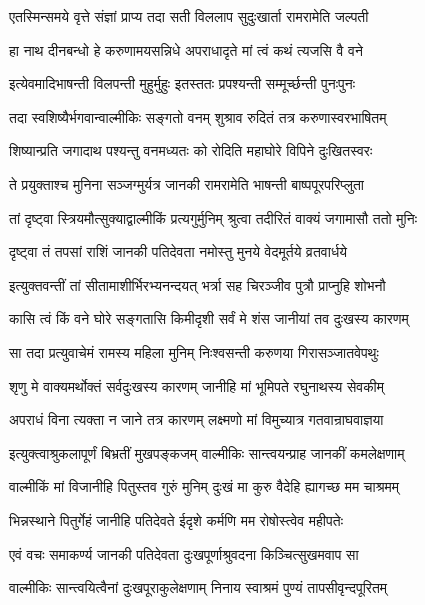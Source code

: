 \twolineshloka
{एतस्मिन्समये वृत्ते संज्ञां प्राप्य तदा सती}
{विललाप सुदुःखार्ता रामरामेति जल्पती}%

\twolineshloka
{हा नाथ दीनबन्धो हे करुणामयसन्निधे}
{अपराधादृते मां त्वं कथं त्यजसि वै वने}%

\twolineshloka
{इत्येवमादिभाषन्ती विलपन्ती मुहुर्मुहुः}
{इतस्ततः प्रपश्यन्ती सम्मूर्च्छन्ती पुनःपुनः}%

\twolineshloka
{तदा स्वशिष्यैर्भगवान्वाल्मीकिः सङ्गतो वनम्}
{शुश्राव रुदितं तत्र करुणास्वरभाषितम्}%

\twolineshloka
{शिष्यान्प्रति जगादाथ पश्यन्तु वनमध्यतः}
{को रोदिति महाघोरे विपिने दुःखितस्वरः}%

\twolineshloka
{ते प्रयुक्ताश्च मुनिना सञ्जग्मुर्यत्र जानकी}
{रामरामेति भाषन्ती बाष्पपूरपरिप्लुता}%

\twolineshloka
{तां दृष्ट्वा स्त्रियमौत्सुक्याद्वाल्मीकिं प्रत्यगुर्मुनिम्}
{श्रुत्वा तदीरितं वाक्यं जगामासौ ततो मुनिः}%

\twolineshloka
{दृष्ट्वा तं तपसां राशिं जानकी पतिदेवता}
{नमोस्तु मुनये वेदमूर्तये व्रतवार्धये}%

\twolineshloka
{इत्युक्तवन्तीं तां सीतामाशीर्भिरभ्यनन्दयत्}
{भर्त्रा सह चिरञ्जीव पुत्रौ प्राप्नुहि शोभनौ}%

\twolineshloka
{कासि त्वं किं वने घोरे सङ्गतासि किमीदृशी}
{सर्वं मे शंस जानीयां तव दुःखस्य कारणम्}%

\twolineshloka
{सा तदा प्रत्युवाचेमं रामस्य महिला मुनिम्}
{निःश्वसन्ती करुणया गिरासञ्जातवेपथुः}%

\twolineshloka
{शृणु मे वाक्यमर्थोक्तं सर्वदुःखस्य कारणम्}
{जानीहि मां भूमिपते रघुनाथस्य सेवकीम्}%

\twolineshloka
{अपराधं विना त्यक्ता न जाने तत्र कारणम्}
{लक्ष्मणो मां विमुच्यात्र गतवान्राघवाज्ञया}%

\twolineshloka
{इत्युक्त्वाश्रुकलापूर्णं बिभ्रतीं मुखपङ्कजम्}
{वाल्मीकिः सान्त्वयन्प्राह जानकीं कमलेक्षणाम्}%

\twolineshloka
{वाल्मीकिं मां विजानीहि पितुस्तव गुरुं मुनिम्}
{दुःखं मा कुरु वैदेहि ह्यागच्छ मम चाश्रमम्}%

\twolineshloka
{भिन्नस्थाने पितुर्गेहं जानीहि पतिदेवते}
{ईदृशे कर्मणि मम रोषोस्त्वेव महीपतेः}%

\twolineshloka
{एवं वचः समाकर्ण्य जानकी पतिदेवता}
{दुःखपूर्णाश्रुवदना किञ्चित्सुखमवाप सा}%


\twolineshloka
{वाल्मीकिः सान्त्वयित्वैनां दुःखपूराकुलेक्षणाम्}
{निनाय स्वाश्रमं पुण्यं तापसीवृन्दपूरितम्}%

